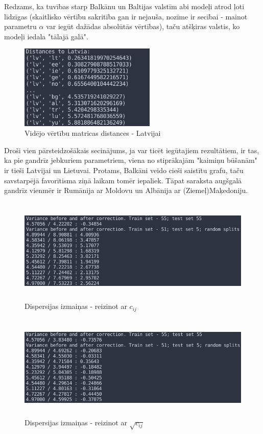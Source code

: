 \documentclass[12pt, a4paper]{article}
\numberwithin{equation}{section} %
\begin{document}
Redzams, ka tuvības starp Balkānu un Baltijas valstīm abi modeļi atrod ļoti līdzīgas (skaitlisko vērtību sakritība gan ir nejauša, nozīme ir secībai - mainot parametru $\alpha$ var iegūt dažādas absolūtās vērtības), taču atšķiras valstis, ko modeļi iedala "tālajā galā".
\begin{figure}[h!]
    \centering
    \includegraphics[height=4cm,page=1]{../img/close-far-lv-model.png}
    \caption{Vidējo vērtību matricas distances - Latvijai}
\end{figure}

Droši vien pārsteidzošākais secinājums, ja var ticēt iegūtajiem rezultātiem, ir tas, ka pie gandrīz jebkuriem parametriem, viena no stiprākajām "kaimiņu būšanām" ir tieši Latvijai un Lietuvai. Protams, Balkāni veido cieši saistītu grafu, taču savstarpējā favorītisma ziņā laikam tomēr iepaliek. Tāpat saraksta augšgalā gandrīz vienmēr ir Rumānija ar Moldovu un Albānija ar (Ziemeļ)Maķedoniju.


\begin{figure}[h!]
    \centering
    \includegraphics[height=5cm]{../img/output-variance-bad.png}
    \caption{Dispersijas izmaiņas - reizinot ar $c_{ij}$}
\end{figure}
\newpage
\begin{figure}[h!]
    \centering
    \includegraphics[height=5cm,page=1]{../img/output-variance.png}
    \caption{Dispersijas izmaiņas - reizinot ar $\sqrt{c_{ij}}$}
\end{figure}
\end{document}
